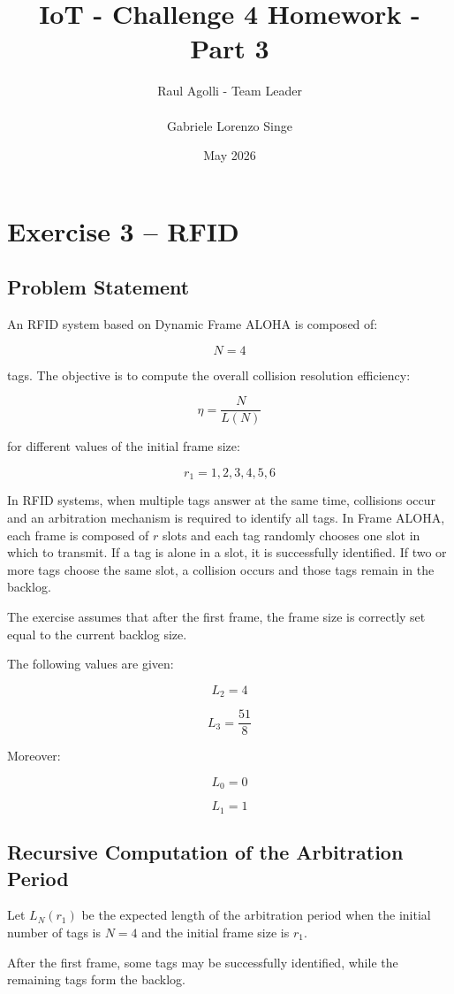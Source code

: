 \documentclass[a4paper,12pt]{article}
\title{IoT - Challenge 4 Homework - Part 3}
\author{Raul Agolli - Team Leader \\\\ Gabriele Lorenzo Singe}
\date{May 2026}
\begin{document}
\maketitle
\section{Exercise 3 -- RFID}

\subsection{Problem Statement}

An RFID system based on Dynamic Frame ALOHA is composed of:

\[
N=4
\]

tags. The objective is to compute the overall collision resolution efficiency:

\[
\eta = \frac{N}{L(N)}
\]

for different values of the initial frame size:

\[
r_1 = 1,2,3,4,5,6
\]

In RFID systems, when multiple tags answer at the same time, collisions occur and an arbitration mechanism is required to identify all tags. In Frame ALOHA, each frame is composed of \(r\) slots and each tag randomly chooses one slot in which to transmit. If a tag is alone in a slot, it is successfully identified. If two or more tags choose the same slot, a collision occurs and those tags remain in the backlog.

The exercise assumes that after the first frame, the frame size is correctly set equal to the current backlog size.

The following values are given:

\[
L_2 = 4
\]

\[
L_3 = \frac{51}{8}
\]

Moreover:

\[
L_0 = 0
\]

\[
L_1 = 1
\]

\subsection{Recursive Computation of the Arbitration Period}

Let \(L_N(r_1)\) be the expected length of the arbitration period when the initial number of tags is \(N=4\) and the initial frame size is \(r_1\).

After the first frame, some tags may be successfully identified, while the remaining tags form the backlog.
\end{document}
